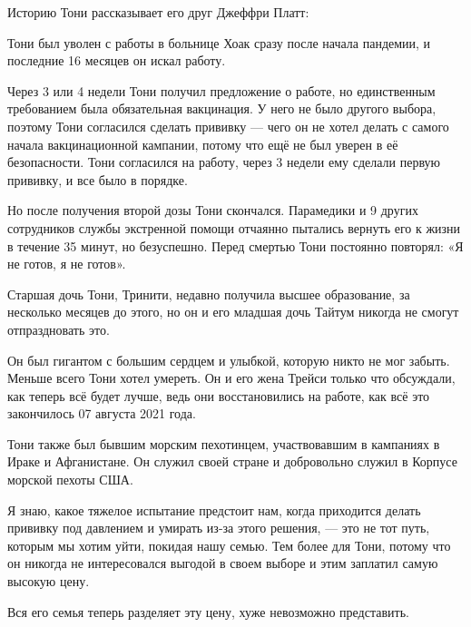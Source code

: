 Историю Тони рассказывает его друг Джеффри Платт:

Тони был уволен с работы в больнице Хоак сразу после начала пандемии, и
последние 16 месяцев он искал работу.

Через 3 или 4 недели Тони получил предложение о работе, но единственным
требованием была обязательная вакцинация. У него не было другого выбора, поэтому
Тони согласился сделать прививку — чего он не хотел делать с самого начала
вакцинационной кампании, потому что ещё не был уверен в её безопасности. Тони
согласился на работу, через 3 недели ему сделали первую прививку, и все было в
порядке.

Но после получения второй дозы Тони скончался. Парамедики и 9 других сотрудников
службы экстренной помощи отчаянно пытались вернуть его к жизни в течение 35
минут, но безуспешно. Перед смертью Тони постоянно повторял: «Я не готов, я не
готов».

Старшая дочь Тони, Тринити, недавно получила высшее образование, за несколько
месяцев до этого, но он и его младшая дочь Тайтум никогда не смогут
отпраздновать это.

Он был гигантом с большим сердцем и улыбкой, которую никто не мог забыть. Меньше
всего Тони хотел умереть. Он и его жена Трейси только что обсуждали, как теперь
всё будет лучше, ведь они восстановились на работе, как всё это закончилось 07
августа 2021 года.

Тони также был бывшим морским пехотинцем, участвовавшим в кампаниях в Ираке и
Афганистане. Он служил своей стране и добровольно служил в Корпусе морской
пехоты США.

Я знаю, какое тяжелое испытание предстоит нам, когда приходится делать прививку
под давлением и умирать из-за этого решения, — это не тот путь, которым мы хотим
уйти, покидая нашу семью. Тем более для Тони, потому что он никогда не
интересовался выгодой в своем выборе и этим заплатил самую высокую цену.

Вся его семья теперь разделяет эту цену, хуже невозможно представить.
